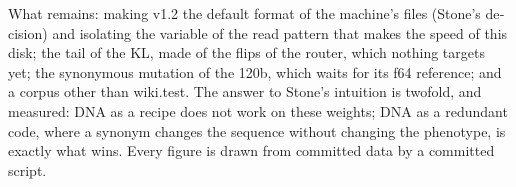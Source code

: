 \begin{otherlanguage}{english}
What remains: making v1.2 the default format of the machine's files (Stone's decision) and isolating the variable of the read pattern that makes the speed of this disk; the tail of the KL, made of the flips of the router, which nothing targets yet; the synonymous mutation of the 120b, which waits for its f64 reference; and a corpus other than wiki.test. The answer to Stone's intuition is twofold, and measured: DNA as a recipe does not work on these weights; DNA as a redundant code, where a synonym changes the sequence without changing the phenotype, is exactly what wins. Every figure is drawn from committed data by a committed script.
\end{otherlanguage}

\begingroup
{}%
